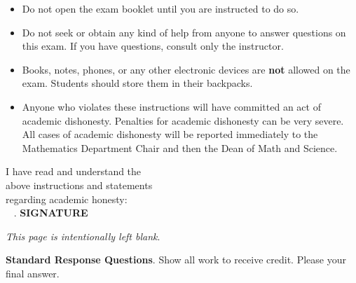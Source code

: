 \documentclass[addpoints,12pt,answers]{exam}
\begin{document}
{\begin{minipage}{6.3in}
\begin{itemize}
		\item Do not open the exam booklet until you are instructed to do so.
		\item Do not seek or obtain any kind of help from anyone to answer questions on this exam. If you have questions, consult only the instructor.
		\item Books, notes, phones, or any other electronic devices are \textbf{not} allowed on the exam. Students should store them in their backpacks.
		\item Anyone who violates these instructions will have committed an act of academic dishonesty.
		Penalties for academic dishonesty can be very severe. All cases of academic dishonesty will be reported immediately to the Mathematics Department Chair and then the Dean of Math and Science.
	\end{itemize}
\end{minipage}

\vspace{1cm}

\noindent I have read and understand the\\ above instructions and statements\\ regarding academic honesty:  \, \, \hrulefill\\
\ {\color{white} .} \hspace{11 cm} \textbf{{\footnotesize SIGNATURE}}}


\vfill

\newpage
\phantom{.}
\vfill
\begin{center}
   \textit{This page is intentionally left blank}.
\end{center}
\vfill

\newpage


\begin{tcolorbox}[colback=gray!15,colframe=black]
		{\textbf{Standard Response Questions}. Show all work to receive credit. Please  your final answer. }
\end{tcolorbox}



\vspace{-.5cm}

\end{document}
